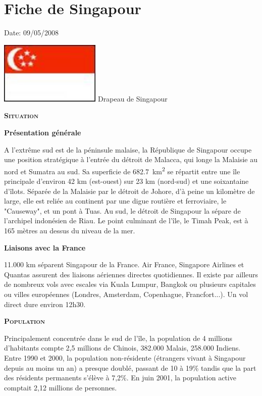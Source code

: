 \section{Fiche de Singapour}

Date: 09/05/2008

\begin{multicols}{2}

\hspace*{-0.65cm}
\includegraphics[width=4.8cm]{articles/Fiche-de-singapour/1210328633arj0.jpg}
Drapeau de Singapour


\textbf{\textsc{Situation}}

\textbf{Présentation générale}

A l'extrême sud est de la péninsule malaise, la République de Singapour occupe une position stratégique à l'entrée du détroit de Malacca, qui longe la Malaisie au nord et Sumatra au sud. Sa superficie de \SI{682.7}{km^2} se répartit entre une île principale d'environ 42 km (est-ouest) sur 23 km (nord-sud) et une soixantaine d'îlots. Séparée de la Malaisie par le détroit de Johore, d'à peine un kilomètre de large, elle est reliée au continent par une digue routière et ferroviaire, le "Causeway", et un pont à Tuas. Au sud, le détroit de Singapour la sépare de l'archipel indonésien de Riau. Le point culminant de l'île, le Timah Peak, est à 165 mètres au dessus du niveau de la mer.

\textbf{Liaisons avec la France}

11.000 km séparent Singapour de la France. Air France, Singapore Airlines et Quantas assurent des liaisons aériennes directes quotidiennes. Il existe par ailleurs de nombreux vols avec escales via Kuala Lumpur, Bangkok ou plusieurs capitales ou villes européennes (Londres, Amsterdam, Copenhague, Francfort...). Un vol direct dure environ 12h30.

\textbf{\textsc{Population}}

Principalement concentrée dans le sud de l'île, la population de 4 millions d'habitants compte 2,5 millions de Chinois, 382.000 Malais, 258.000 Indiens. Entre 1990 et 2000, la population non-résidente (étrangers vivant à Singapour depuis au moins un an) a presque doublé, passant de 10 à 19\% tandis que la part des résidents permanents s'élève à 7,2\%. En juin 2001, la population active comptait 2,12 millions de personnes.


\end{multicols}
